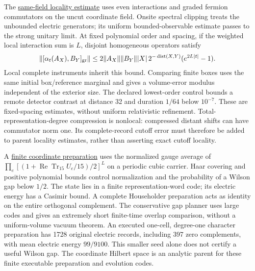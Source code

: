 The \href{https://github.com/FloatingPragma/observer-patch-holography/blob/main/model/particle_field_causality/PROOF.md}{same-field locality estimate}
uses even interactions and graded fermion commutators on the uncut
coordinate field. Onsite spectral clipping treats the unbounded electric
generators; its uniform bounded-observable estimate passes to the strong
unitary limit. At fixed polynomial order and spacing, if the weighted
local interaction sum is $L$, disjoint homogeneous operators satisfy
\[
 \|[\alpha_t(A_X),B_Y]_{\rm gr}\|
 \le 2\|A_X\|\|B_Y\||X|\,2^{-\operatorname{dist}(X,Y)}
       (e^{2L|t|}-1).
\]
Local complete instruments inherit this bound. Comparing finite boxes
uses the same initial box/reference marginal and gives a volume-error
modulus independent of the exterior size. The declared lowest-order
control bounds a remote detector contrast at distance 32 and duration
$1/64$ below $10^{-7}$. These are fixed-spacing estimates, without
uniform relativistic refinement. Total-representation-degree compression
is nonlocal: compressed distant shifts can have commutator norm one.
Its complete-record cutoff error must therefore be added to parent
locality estimates, rather than asserting exact cutoff locality.

A \href{https://github.com/FloatingPragma/observer-patch-holography/blob/main/model/particle_field_preparation/PROOF.md}{finite coordinate preparation}
uses the normalized gauge average of
$\prod_e[(1+\operatorname{Re}\operatorname{Tr}_{15}U_e/15)/2]^L$
on a periodic cubic carrier. Haar covering and positive polynomial
bounds control normalization and the probability of a Wilson gap below
$1/2$. The state lies in a finite representation-word code; its electric
energy has a Casimir bound. A complete Householder preparation acts as
identity on the entire orthogonal complement. The conservative gap
planner uses large codes and gives an extremely short finite-time
overlap comparison, without a uniform-volume vacuum theorem.
An executed one-cell, degree-one character preparation has 1728 original
electric records, including 397 zero complements, with mean electric
energy $99/9100$. This smaller seed alone does not certify a useful
Wilson gap. The coordinate Hilbert space is an analytic parent for these
finite executable preparation and evolution codes.

